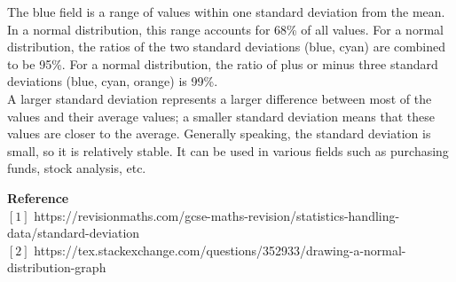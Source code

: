\documentclass[12pt]{report}
\begin{document}
\vspace{-0.4cm}
The blue field is a range of values within one standard deviation from the mean. In a normal distribution, this range accounts for 68\% of all values. For a normal distribution, the ratios of the two standard deviations (blue, cyan) are combined to be 95\%. For a normal distribution, the ratio of plus or minus three standard deviations (blue, cyan, orange) is 99\%.\\
A larger standard deviation represents a larger difference between most of the values and their average values; a smaller standard deviation means that these values are closer to the average. Generally speaking, the standard deviation is small, so it is relatively stable. It can be used in various fields such as purchasing funds, stock analysis, etc.\\
\begin{small}
\textbf{Reference}\\
$\left[1\right]$ https://revisionmaths.com/gcse-maths-revision/statistics-handling-data/standard-deviation\\
$\left[2\right]$ https://tex.stackexchange.com/questions/352933/drawing-a-normal-distribution-graph

\end{small}
\end{document}
